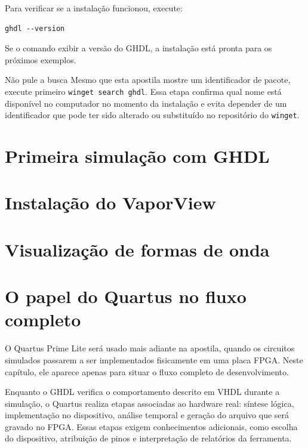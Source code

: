 Para verificar se a instalação funcionou, execute:

\begin{lstlisting}[language={},caption={Verificação da instalação do GHDL.},label={cod:ghdl-version}]
ghdl --version
\end{lstlisting}

Se o comando exibir a versão do GHDL, a instalação está pronta para os próximos exemplos.

\begin{observacao}{Não pule a busca}
Mesmo que esta apostila mostre um identificador de pacote, execute primeiro \texttt{winget search ghdl}. Essa etapa confirma qual nome está disponível no computador no momento da instalação e evita depender de um identificador que pode ter sido alterado ou substituído no repositório do \texttt{winget}.
\end{observacao}

\section{Primeira simulação com GHDL}

\section{Instalação do VaporView}

\section{Visualização de formas de onda}

\section{O papel do Quartus no fluxo completo}

O Quartus Prime Lite será usado mais adiante na apostila, quando os circuitos simulados passarem a ser implementados fisicamente em uma placa FPGA. Neste capítulo, ele aparece apenas para situar o fluxo completo de desenvolvimento.

Enquanto o GHDL verifica o comportamento descrito em VHDL durante a simulação, o Quartus realiza etapas associadas ao hardware real: síntese lógica, implementação no dispositivo, análise temporal e geração do arquivo que será gravado no FPGA. Essas etapas exigem conhecimentos adicionais, como escolha do dispositivo, atribuição de pinos e interpretação de relatórios da ferramenta.

